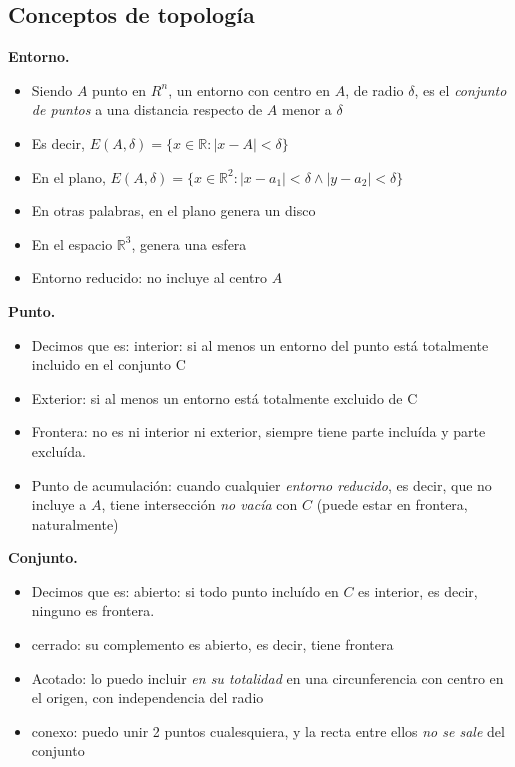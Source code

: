 \subsection{Conceptos de topología}

\textbf{Entorno.}
\begin{itemize}
    \item Siendo \(A\) punto en \(R^{n}\), un entorno con centro en \(A\),
          de radio \(\delta\), es el \textit{conjunto de puntos} a una distancia
          respecto de \(A\) menor a \(\delta\)
    \item Es decir, \(E(A,\delta) = \{x \in \mathbb{R}: |x-A| < \delta\}\)
    \item En el plano,
          \(E(A,\delta) = \{x \in \mathbb{R}^{2}: |x-a_1| < \delta \land |y-a_2| < \delta\}\)
    \item En otras palabras, en el plano genera un disco
    \item En el espacio \(\mathbb{R}^{3}\), genera una esfera
    \item Entorno reducido: no incluye al centro \(A\)
\end{itemize}

\textbf{Punto.}
\begin{itemize}
    \item Decimos que es: interior: si al menos un entorno del punto está
          totalmente incluido en el conjunto C
    \item Exterior: si al menos un entorno está totalmente excluido de C
    \item Frontera: no es ni interior ni exterior, siempre tiene parte
          incluída y parte excluída.
    \item Punto de acumulación: cuando cualquier \textit{entorno reducido},
          es decir, que no incluye a \(A\), tiene intersección \textit{no vacía}
          con \(C\) (puede estar en frontera, naturalmente)
\end{itemize}

\textbf{Conjunto.}
\begin{itemize}
    \item Decimos que es: abierto: si todo punto incluído en \(C\) es interior,
          es decir, ninguno es frontera.
    \item cerrado: su complemento es abierto, es decir, tiene frontera
    \item Acotado: lo puedo incluir \textit{en su totalidad} en una
          circunferencia con centro en el origen, con independencia del radio
    \item conexo: puedo unir 2 puntos cualesquiera, y la recta entre ellos
          \textit{no se sale} del conjunto
\end{itemize}

